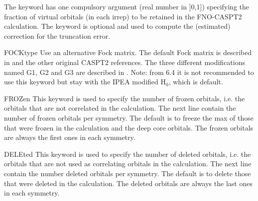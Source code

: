 \begin{keywordlist}
\begin{inputlisting}
\end{inputlisting}
The keyword  has one compulsory argument (real number in ]0,1]) specifying the fraction of virtual orbitals
(in each irrep) to be retained in the FNO-CASPT2 calculation.
The keyword  is optional and used to compute the (estimated) correction for the truncation error.
\item[FOCKtype]
Use an alternative Fock matrix. The default Fock matrix is described in
\cite{Andersson:90,Andersson:92a} and the other original CASPT2 references.
The three different modifications named G1, G2 and G3 are described in
\cite{Andersson:95a}.
Note: from 6.4 it is not recommended to use this keyword but
stay with the IPEA modified H$_0$, which is default.
\item[FROZen]
This keyword is used to specify the number of frozen orbitals,
i.e. the orbitals that are not correlated in the calculation.
The next line contain the number of frozen orbitals per
symmetry. The default is to freeze the max of those that were frozen in the
 calculation and the deep core orbitals.
The frozen orbitals are always the first ones in each symmetry.
\item[DELEted]
This keyword is used to specify the number of deleted orbitals,
i.e. the orbitals that are not used as correlating orbitals in
the calculation. The next line contain the number deleted orbitals per symmetry.
The default is to delete those that were deleted in the 
calculation.
The deleted orbitals are always the last ones in each symmetry.

\end{keywordlist}
